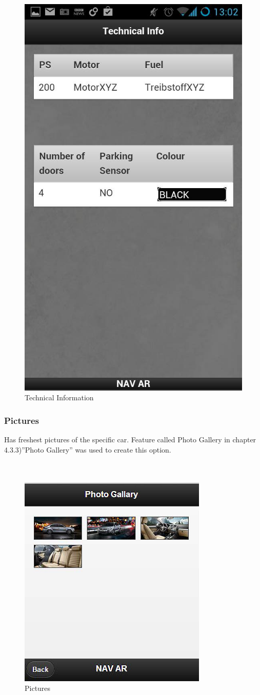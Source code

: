 \begin{figure}[h]
\centering
\includegraphics[width=0.5\linewidth]{graphics/chapter4/6}
\caption{Technical Information}
\end{figure}
\newpage

\subsubsection{Pictures}
Has freshest pictures of the specific car. Feature called Photo Gallery in chapter 4.3.3)''Photo Gallery'' was used to create this option.
\\\\\\
\begin{figure}[h]
\centering
\includegraphics[width=0.5\linewidth]{graphics/chapter4/7}
\caption{Pictures}
\end{figure}
\newpage

